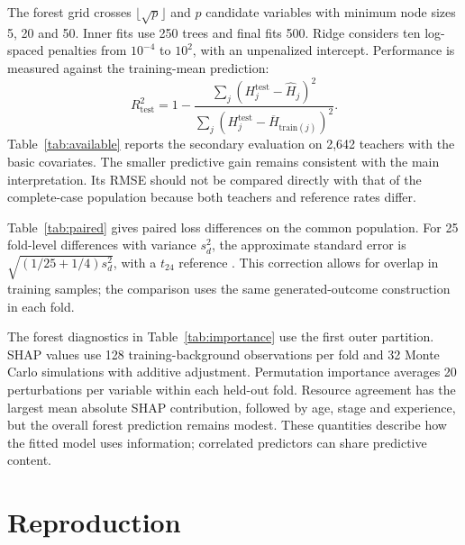 The forest grid crosses $\lfloor\sqrt p\rfloor$ and $p$ candidate variables with minimum node sizes 5, 20 and 50. Inner fits use 250 trees and final fits 500. Ridge considers ten log-spaced penalties from $10^{-4}$ to $10^2$, with an unpenalized intercept. Performance is measured against the training-mean prediction:
\[
R^2_{\mathrm{test}}=1-\frac{\sum_j(H_j^{\mathrm{test}}-\widehat H_j)^2}
{\sum_j(H_j^{\mathrm{test}}-\overline H_{\mathrm{train}(j)})^2}.
\]
Table~\ref{tab:available} reports the secondary evaluation on 2,642 teachers with the basic covariates. The smaller predictive gain remains consistent with the main interpretation. Its RMSE should not be compared directly with that of the complete-case population because both teachers and reference rates differ.

Table~\ref{tab:paired} gives paired loss differences on the common population. For 25 fold-level differences with variance $s_d^2$, the approximate standard error is $\sqrt{(1/25+1/4)s_d^2}$, with a $t_{24}$ reference \citep{nadeau}. This correction allows for overlap in training samples; the comparison uses the same generated-outcome construction in each fold.

The forest diagnostics in Table~\ref{tab:importance} use the first outer partition. SHAP values use 128 training-background observations per fold and 32 Monte Carlo simulations with additive adjustment. Permutation importance averages 20 perturbations per variable within each held-out fold. Resource agreement has the largest mean absolute SHAP contribution, followed by age, stage and experience, but the overall forest prediction remains modest. These quantities describe how the fitted model uses information; correlated predictors can share predictive content.


\section{Reproduction}
\clearpage\color{black}

